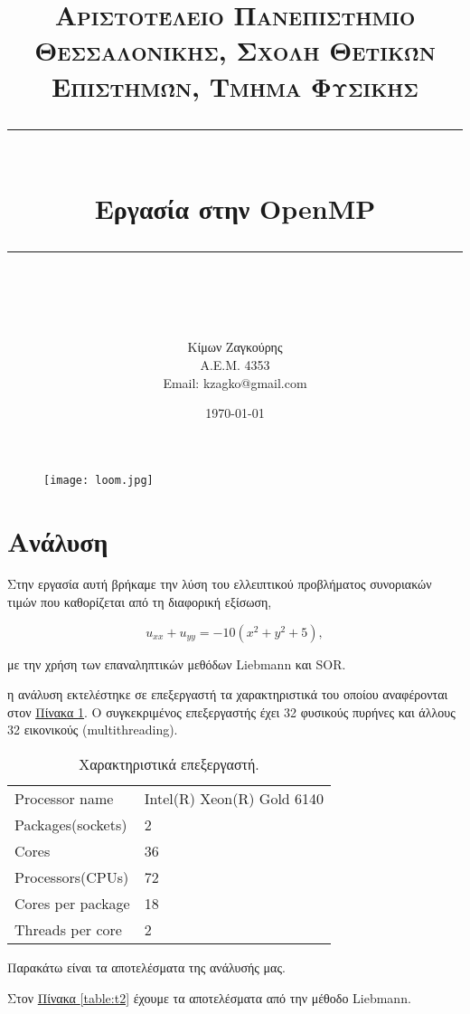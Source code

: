 \documentclass[11pt]{scrartcl} %
\title{	
	\normalfont\normalsize
	\textsc{ Αριστοτέλειο Πανεπιστήμιο Θεσσαλονίκης, Σχολή Θετικών Επιστημών, Τμήμα Φυσικής}\\ %
	\vspace{25pt} %
	\rule{\linewidth}{0.5pt}\\ %
	\vspace{20pt} %
	{\huge Εργασία στην OpenMP }\\ %
	\vspace{12pt} %
	\rule{\linewidth}{2pt}\\ %
	\vspace{12pt} %
}
\author{\LARGE Κίμων Ζαγκούρης \\ A.E.M. 4353 \\ Email: kzagko@gmail.com} %
\date{\normalsize\today} %
\begin{document}
\maketitle


\begin{figure}[H]
	\centering
	\texttt{[image: loom.jpg]}
\end{figure}
\newpage


{}


\section{Ανάλυση}


Στην εργασία αυτή βρήκαμε την λύση του ελλειπτικού προβλήματος συνοριακών τιμών που καθορίζεται
από τη διαφορική εξίσωση,

\begin{equation*}
u_{xx}+u_{yy}=-10\left(x^2+y^2+5\right),
\end{equation*}

με την χρήση των επαναληπτικών μεθόδων Liebmann και SOR. 

η ανάλυση εκτελέστηκε σε επεξεργαστή τα χαρακτηριστικά του οποίου αναφέρονται στον \hyperref[table:t1]{Πίνακα \ref*{table:t1}}. Ο συγκεκριμένος επεξεργαστής έχει 32 φυσικούς πυρήνες και άλλους 32 εικονικούς (multithreading).

\begin{table}[h]
\begin{tabular}{ll}
Processor name & Intel(R) Xeon(R) Gold 6140 \\
Packages(sockets) & 2 \\
Cores & 36 \\
Processors(CPUs) & 72 \\
Cores per package & 18 \\
Threads per core & 2
\end{tabular}
\caption{Χαρακτηριστικά επεξεργαστή.}
\label{table:t1}
\end{table}




Παρακάτω είναι τα αποτελέσματα της ανάλυσής μας.

Στον \hyperref[table:t2]{Πίνακα \ref*{table:t2}} έχουμε τα αποτελέσματα από την μέθοδο Liebmann.
\end{document}
